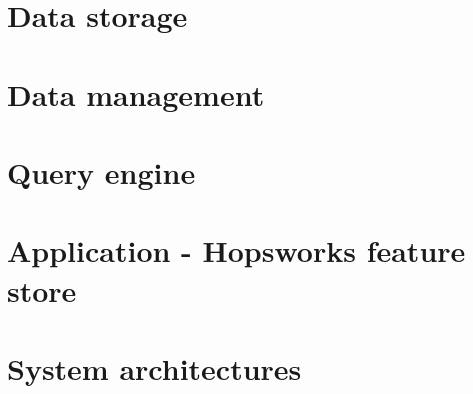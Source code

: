 

\section{Data storage}
    \label{sec:data_storage}
    

\section{Data management}
    \label{sec:data_management}
    

\section{Query engine}
    \label{sec:query_engine}
    

\section{Application - Hopsworks feature store}
    \label{sec:hopswoks_feature_store}
    

\section{System architectures}
    \label{sec:arch_sys}
    

%    